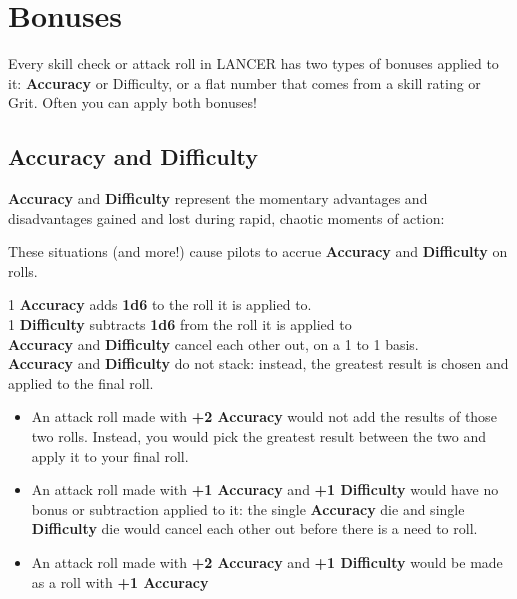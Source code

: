 \providecommand{\Accuracy}{\textbf{Accuracy }}
\providecommand{\Difficulty}{\textbf{Difficulty }}
\section{Bonuses}
Every skill check or attack roll in LANCER has two types of bonuses applied to it: \Accuracy or
Difficulty, or a flat number that comes from a skill rating or Grit. Often you can apply both bonuses!

\subsection{Accuracy and Difficulty}
\Accuracy and \Difficulty represent the momentary advantages and disadvantages gained and
lost during rapid, chaotic moments of action:


These situations (and more!) cause pilots to accrue \Accuracy and \Difficulty on rolls.

1 \Accuracy adds \textbf{1d6} to the roll it is applied to. \\
1 \Difficulty subtracts \textbf{1d6} from the roll it is applied to \\
\Accuracy and \Difficulty cancel each other out, on a 1 to 1 basis. \\
\Accuracy and \Difficulty do not stack: instead, the greatest result is chosen and applied to the
final roll. \\
\begin{itemize}
\item An attack roll made with \textbf{+2 Accuracy} would not add the results of those two rolls. Instead, you would pick the greatest result between the two and apply it to your final roll.
\item An attack roll made with \textbf{+1 Accuracy} and \textbf{+1 Difficulty} would have no bonus or subtraction applied to it: the single \Accuracy die and single \Difficulty die would cancel each other out before there is a need to roll.
\item An attack roll made with \textbf{+2 Accuracy} and \textbf{+1 Difficulty} would be made as a roll with \textbf{+1 Accuracy}
\end{itemize}

